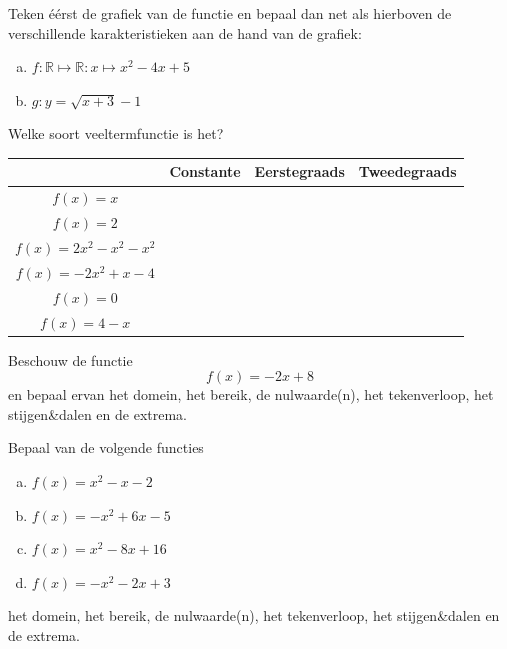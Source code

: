 \documentclass[12pt,a4paper,twoside]{article}
\begin{document}
\begin{oefening}
Teken éérst de grafiek van de functie en bepaal dan net als hierboven de verschillende karakteristieken aan de hand van de grafiek:
\begin{enumerate}[(a)]
  \item $f:\mathbb{R}\mapsto\mathbb{R}: x\mapsto x^2 -4x + 5$
  \item $g: y=\sqrt{x+3}-1$
\end{enumerate}
\end{oefening}

\begin{oefening}
Welke soort veeltermfunctie is het?
\begin{center}
\begin{tabular}{c|c|c|c}
                                  & Constante & Eerstegraads & Tweedegraads \\
\hline
$\displaystyle f(x)=x$            &           &              &              \\
$\displaystyle f(x)=2$            &           &              &              \\
$\displaystyle f(x)=2x^2-x^2-x^2$ &           &              &              \\
$\displaystyle f(x)=-2x^2+x-4$    &           &              &              \\
$\displaystyle f(x)=0$            &           &              &              \\
$\displaystyle f(x)=4-x$          &           &              &              \\
\end{tabular}
\end{center}
\end{oefening}

\begin{oefening}
Beschouw de functie
$$f(x)=-2x+8$$
en bepaal ervan het domein, het bereik, de nulwaarde(n), het tekenverloop, het stijgen\&dalen en de extrema.
\end{oefening}

\begin{oefening}
Bepaal van de volgende functies
\begin{enumerate}[(a)]
  \item $\displaystyle f(x)=x^2-x-2$
  \item $\displaystyle f(x)=-x^2+6x-5$
  \item $\displaystyle f(x)=x^2-8x+16$
  \item $\displaystyle f(x)=-x^2-2x+3$
\end{enumerate}
het domein, het bereik, de nulwaarde(n), het tekenverloop, het stijgen\&dalen en de extrema.
\end{oefening}
\end{document}

